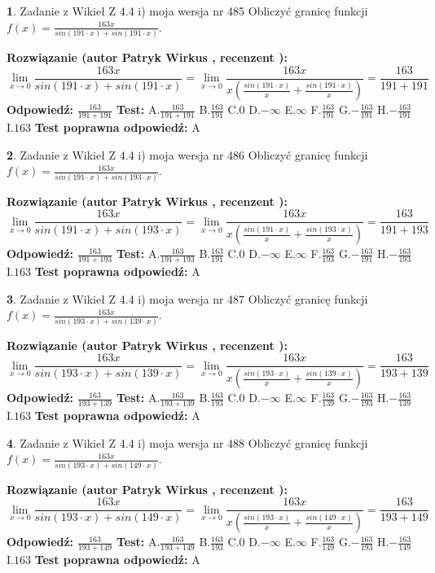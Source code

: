 \documentclass[12pt, a4paper]{article}
\theoremstyle{definition} %
\newtheorem{zad}{}
\newcommand{\zadStart}[1]{\begin{zad}#1\newline}
\newcommand{\zadStop}{\end{zad}}
\newcommand{\rozwStart}[2]{\noindent \textbf{Rozwiązanie (autor #1 , recenzent #2): }\newline}
\newcommand{\rozwStop}{\newline}
\newcommand{\odpStart}{\noindent \textbf{Odpowiedź:}\newline}
\newcommand{\odpStop}{\newline}
\newcommand{\testStart}{\noindent \textbf{Test:}\newline}
\newcommand{\testStop}{\newline}
\newcommand{\kluczStart}{\noindent \textbf{Test poprawna odpowiedź:}\newline}
\newcommand{\kluczStop}{\newline}
\begin{document}
\zadStart{Zadanie z Wikieł Z 4.4 i) moja wersja nr 485}
Obliczyć granicę funkcji $f(x)=\frac{163x}{sin(191\cdot x) +sin(191\cdot x)}$.
\zadStop
\rozwStart{Patryk Wirkus}{}
$$\lim\limits_{x\to 0}\frac{163x}{sin(191\cdot x) +sin(191\cdot x)}=\lim\limits_{x\to 0}\frac{163x}{x(\frac{sin(191\cdot x)}{x}+\frac{sin(191\cdot x)}{x})}=\frac{163}{191+191}$$
\rozwStop
\odpStart
$\frac{163}{191+191}$
\odpStop
\testStart
A.$\frac{163}{191+191}$
B.$\frac{163}{191}$
C.$0$
D.$-\infty$
E.$\infty$
F.$\frac{163}{191}$
G.$-\frac{163}{191}$
H.$-\frac{163}{191}$
I.$163$
\testStop
\kluczStart
A
\kluczStop



\zadStart{Zadanie z Wikieł Z 4.4 i) moja wersja nr 486}
Obliczyć granicę funkcji $f(x)=\frac{163x}{sin(191\cdot x) +sin(193\cdot x)}$.
\zadStop
\rozwStart{Patryk Wirkus}{}
$$\lim\limits_{x\to 0}\frac{163x}{sin(191\cdot x) +sin(193\cdot x)}=\lim\limits_{x\to 0}\frac{163x}{x(\frac{sin(191\cdot x)}{x}+\frac{sin(193\cdot x)}{x})}=\frac{163}{191+193}$$
\rozwStop
\odpStart
$\frac{163}{191+193}$
\odpStop
\testStart
A.$\frac{163}{191+193}$
B.$\frac{163}{191}$
C.$0$
D.$-\infty$
E.$\infty$
F.$\frac{163}{193}$
G.$-\frac{163}{191}$
H.$-\frac{163}{193}$
I.$163$
\testStop
\kluczStart
A
\kluczStop



\zadStart{Zadanie z Wikieł Z 4.4 i) moja wersja nr 487}
Obliczyć granicę funkcji $f(x)=\frac{163x}{sin(193\cdot x) +sin(139\cdot x)}$.
\zadStop
\rozwStart{Patryk Wirkus}{}
$$\lim\limits_{x\to 0}\frac{163x}{sin(193\cdot x) +sin(139\cdot x)}=\lim\limits_{x\to 0}\frac{163x}{x(\frac{sin(193\cdot x)}{x}+\frac{sin(139\cdot x)}{x})}=\frac{163}{193+139}$$
\rozwStop
\odpStart
$\frac{163}{193+139}$
\odpStop
\testStart
A.$\frac{163}{193+139}$
B.$\frac{163}{193}$
C.$0$
D.$-\infty$
E.$\infty$
F.$\frac{163}{139}$
G.$-\frac{163}{193}$
H.$-\frac{163}{139}$
I.$163$
\testStop
\kluczStart
A
\kluczStop



\zadStart{Zadanie z Wikieł Z 4.4 i) moja wersja nr 488}
Obliczyć granicę funkcji $f(x)=\frac{163x}{sin(193\cdot x) +sin(149\cdot x)}$.
\zadStop
\rozwStart{Patryk Wirkus}{}
$$\lim\limits_{x\to 0}\frac{163x}{sin(193\cdot x) +sin(149\cdot x)}=\lim\limits_{x\to 0}\frac{163x}{x(\frac{sin(193\cdot x)}{x}+\frac{sin(149\cdot x)}{x})}=\frac{163}{193+149}$$
\rozwStop
\odpStart
$\frac{163}{193+149}$
\odpStop
\testStart
A.$\frac{163}{193+149}$
B.$\frac{163}{193}$
C.$0$
D.$-\infty$
E.$\infty$
F.$\frac{163}{149}$
G.$-\frac{163}{193}$
H.$-\frac{163}{149}$
I.$163$
\testStop
\kluczStart
A
\kluczStop
\end{document}
